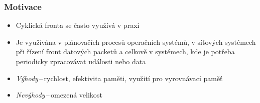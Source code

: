 \documentclass[]{fitthesispresn}
\begin{document}
    \frame[plain]{\titlepage} %

    \begin{frame}
        \frametitle{Motivace}
        \begin{itemize}
            \item Cyklická fronta se často využívá v praxi
            \item Je využívána v plánovačích procesů operačních systémů, v síťových systémech při řízení front datových packetů a celkově v systémech, kde je potřeba periodicky zpracovávat události nebo data
            \item \emph{Výhody}\,--\,rychlost, efektivita paměti, využití pro vyrovnávací paměť
            \item \emph{Nevýhody}\,--\,omezená velikost
        \end{itemize}
    \end{frame}
\end{document}
